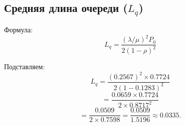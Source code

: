 \documentclass[a4paper,12pt]{article}
\begin{document}
\subsection{Средняя длина очереди ($L_q$)}
Формула:
\begin{equation}
    L_q = \frac{(\lambda/\mu)^2 P_0}{2(1 - \rho)^2}
\end{equation}

Подставляем:
\begin{equation}
    L_q = \frac{(0.2567)^2 \times 0.7724}{2(1 - 0.1283)^2}
\end{equation}
\begin{equation}
    = \frac{0.0659 \times 0.7724}{2 \times 0.8717^2}
\end{equation}
\begin{equation}
    = \frac{0.0509}{2 \times 0.7598} = \frac{0.0509}{1.5196} \approx 0.0335.
\end{equation}
\end{document}
